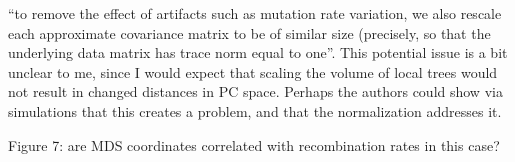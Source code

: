 
\begin{point}{}
``to remove the effect of artifacts such as mutation rate variation, we also rescale each
approximate covariance matrix to be of similar size (precisely, so that the underlying data
matrix has trace norm equal to one''. This potential issue is a bit unclear to me, since I would
expect that scaling the volume of local trees would not result in changed distances in PC
space. Perhaps the authors could show via simulations that this creates a problem, and that the
normalization addresses it.
\end{point}

\begin{point}{Figure 7:}
are MDS coordinates correlated with recombination rates in this case?
\end{point}

